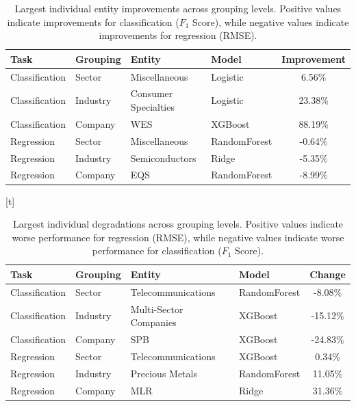 \begin{table}[t]
\centering
\caption{Largest individual entity improvements across grouping levels. Positive values indicate improvements for classification ($F_1$ Score), while negative values indicate improvements for regression (RMSE).}
\label{tab:best_entity_results}
\begin{tabular}{|l|l|l|l|c|}
\hline
Task & Grouping & Entity & Model & Improvement \\
\hline
Classification & Sector   & Miscellaneous            & Logistic     & 6.56\% \\
Classification & Industry & Consumer Specialties     & Logistic     & 23.38\% \\
Classification & Company  & WES                      & XGBoost      & 88.19\% \\
\hline
Regression & Sector   & Miscellaneous  & RandomForest & -0.64\% \\
Regression & Industry & Semiconductors & Ridge        & -5.35\% \\
Regression & Company  & EQS            & RandomForest & -8.99\% \\
\hline
\end{tabular}[t]
\end{table}

\begin{table}
\centering
\caption{Largest individual degradations across grouping levels. Positive values indicate worse performance for regression (RMSE), while negative values indicate worse performance for classification ($F_1$ Score).}
\label{tab:worst_entity_results}
\begin{tabular}{|l|l|l|l|c|}
\hline
Task & Grouping & Entity & Model & Change \\
\hline
Classification & Sector   & Telecommunications     & RandomForest & -8.08\% \\
Classification & Industry & Multi-Sector Companies & XGBoost      & -15.12\% \\
Classification & Company  & SPB                   & XGBoost      & -24.83\% \\
\hline
Regression & Sector   & Telecommunications & XGBoost      & 0.34\% \\
Regression & Industry & Precious Metals    & RandomForest & 11.05\% \\
Regression & Company  & MLR                & Ridge        & 31.36\% \\
\hline
\end{tabular}
\end{table}

